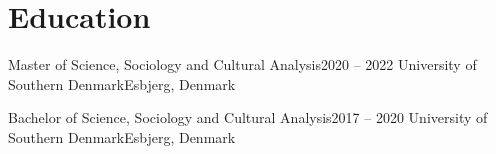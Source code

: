 \section{Education}
\mySubHeadingListStart

  \mySubHeading
    {Master of Science, Sociology and Cultural Analysis}{2020 -- 2022}
    {University of Southern Denmark}{Esbjerg, Denmark}
    \myItemListStart
    \myItemListEnd

  \mySubHeading
    {Bachelor of Science, Sociology and Cultural Analysis}{2017 -- 2020}
    {University of Southern Denmark}{Esbjerg, Denmark}
    \myItemListStart
    \myItemListEnd

\mySubHeadingListEnd
